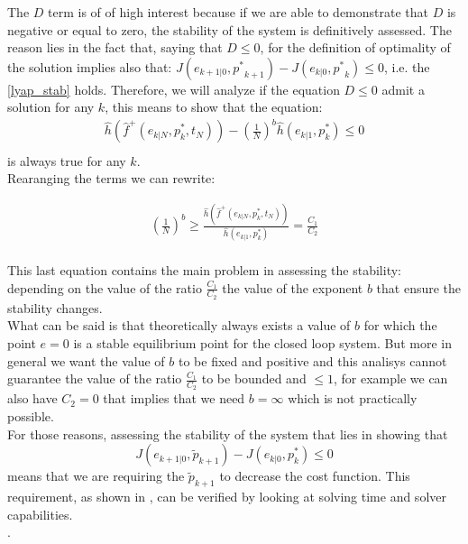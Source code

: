 \documentclass[12pt]{article}
\begin{document}
The $D$ term is of of high interest because if we are able to demonstrate that $D$ is negative or equal to zero, the stability of the system is definitively assessed. The reason lies in the fact that, saying that $D\leq0$, for the definition of optimality of the solution implies also that: $J({e}_{k+1|0},{p^*}_{k+1}) - J({e}_{k|0},{p^*}_k) \leq 0$, i.e. the \ref{lyap_stab} holds. Therefore, we will analyze if the equation $D\leq0$ admit a solution for any $k$, this means to show that the equation: 
\begin{equation}
\begin{split}
	\hat{h}(\hat{f}^+(e_{k|N},p^*_k,t_N))-\left( \frac{1}{N} \right)^b\hat{h}(e_{k|1},p^*_{k}) \leq 0 \\
\end{split}
\end{equation}
is always true for any $k$. \\

Rearanging the terms we can rewrite: 

\begin{equation}
\begin{split}
	\left( \frac{1}{N} \right)^b \geq \frac{\hat{h}(\hat{f}^+(e_{k|N},p^*_k,t_N))}{\hat{h}(e_{k|1},p^*_{k})}=\frac{C_1}{C_2} \\
\end{split}
\end{equation}

This last equation contains the main problem in assessing the stability: depending on the value of the ratio $\frac{C_1}{C_2}$ the value of the exponent $b$ that ensure the stability changes.\\
What can be said is that theoretically always exists a value of $b$ for which the point $e=0$ is a stable equilibrium point for the closed loop system. But more in general we want the value of $b$ to be fixed and positive and this analisys cannot guarantee the value of the ratio $\frac{C_1}{C_2}$ to be bounded and $\leq 1$, for example we can also have $C_2=0$ that implies that we need $b=\infty$ which is not practically possible.\\
For those reasons, assessing the stability of the system that lies in showing that 
\begin{equation}
	J({e}_{k+1|0},\tilde{p}_{k+1})-J({e}_{k|0},p^*_k) \leq 0
\end{equation}
means that we are requiring the $\tilde{p}_{k+1}$ to decrease the cost function. This requirement, as shown in \cite{alamir_boh}, can be verified by looking at solving time and solver capabilities.
 \\
.
\end{document}
